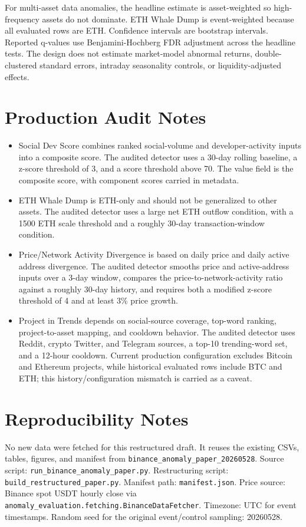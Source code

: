 \documentclass[11pt]{article}
\begin{document}
For multi-asset data anomalies, the headline estimate is asset-weighted so high-frequency assets do not dominate. ETH Whale Dump is event-weighted because all evaluated rows are ETH. Confidence intervals are bootstrap intervals. Reported q-values use Benjamini-Hochberg FDR adjustment across the headline tests. The design does not estimate market-model abnormal returns, double-clustered standard errors, intraday seasonality controls, or liquidity-adjusted effects.

\section{Production Audit Notes}
\begin{itemize}
\item Social Dev Score combines ranked social-volume and developer-activity inputs into a composite score. The audited detector uses a 30-day rolling baseline, a z-score threshold of 3, and a score threshold above 70. The value field is the composite score, with component scores carried in metadata.
\item ETH Whale Dump is ETH-only and should not be generalized to other assets. The audited detector uses a large net ETH outflow condition, with a 1500 ETH scale threshold and a roughly 30-day transaction-window condition.
\item Price/Network Activity Divergence is based on daily price and daily active address divergence. The audited detector smooths price and active-address inputs over a 3-day window, compares the price-to-network-activity ratio against a roughly 30-day history, and requires both a modified z-score threshold of 4 and at least 3\% price growth.
\item Project in Trends depends on social-source coverage, top-word ranking, project-to-asset mapping, and cooldown behavior. The audited detector uses Reddit, crypto Twitter, and Telegram sources, a top-10 trending-word set, and a 12-hour cooldown. Current production configuration excludes Bitcoin and Ethereum projects, while historical evaluated rows include BTC and ETH; this history/configuration mismatch is carried as a caveat.
\end{itemize}

\section{Reproducibility Notes}
No new data were fetched for this restructured draft. It reuses the existing CSVs, tables, figures, and manifest from \texttt{binance\_anomaly\_paper\_20260528}. Source script: \texttt{run\_binance\_anomaly\_paper.py}. Restructuring script: \texttt{build\_restructured\_paper.py}. Manifest path: \texttt{manifest.json}. Price source: Binance spot USDT hourly close via \texttt{anomaly\_evaluation.fetching.BinanceDataFetcher}. Timezone: UTC for event timestamps. Random seed for the original event/control sampling: 20260528.
\end{document}

